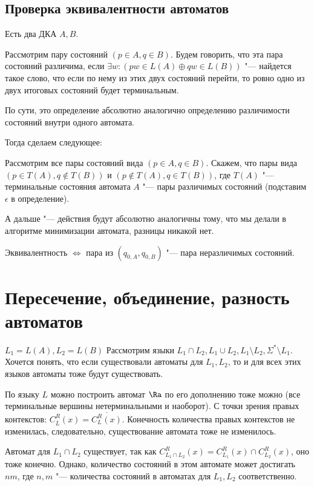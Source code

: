\subsection{Проверка эквивалентности автоматов}

\begin{Def}
Есть два ДКА $A, B$.

Рассмотрим пару состояний $(p \in A, q \in B)$. 
Будем говорить, что эта пара состояний различима, если $\exists w: (pw \in L(A) \oplus qw \in L(B))$ "---
найдется такое слово, что если по нему из этих двух состояний перейти, то ровно одно из двух итоговых состояний будет терминальным.
\end{Def}
\begin{Rem}
По сути, это определение абсолютно аналогично определению различимости состояний внутри одного автомата.
\end{Rem}

Тогда сделаем следующее:

Рассмотрим все пары состояний вида $(p \in A, q \in B)$.
Скажем, что пары вида $(p \in T(A), q \notin T(B))$ и $(p \notin T(A), q \in T(B))$, где $T(A)$ "--- терминальные состояния автомата $A$ "--- пары различимых состояний (подставим $\epsilon$ в определение).

А дальше "--- действия будут абсолютно аналогичны тому, что мы делали в алгоритме минимизации автомата, разницы никакой нет.

Эквивалентность $\iff$ пара из $(q_{0, A}, q_{0, B})$ "--- пара неразличимых состояний.

\section{Пересечение, объединение, разность автоматов}
$L_1 = L(A), L_2 = L(B)$
Рассмотрим языки $L_1 \cap L_2, L_1 \cup L_2, L_1 \setminus L_2, \Sigma^* \setminus L_1$. 
Хочется понять, что если существовали автоматы для $L_1, L_2$, то и для всех этих языков автоматы тоже будут существовать. 

По языку $L$ можно построить автомат $\Ra$ по его дополнению тоже можно (все терминальные вершины нетерминальными и наоборот).
С точки зрения правых контекстов: $C_{\overline{L}}^R(x) = \overline{C_L^R(x)}$. Конечность количества правых контекстов не изменилась, следовательно, существование автомата тоже не изменилось.

Автомат для $L_1 \cap L_2$ существует, так как $C_{L_1 \cap L_2}^R(x) = C_{L_1}^R(x) \cap C_{L_2}^R(x)$, оно тоже конечно. 
Однако, количество состояний в этом автомате может достигать $nm$, где $n, m$ "--- количества состояний в автоматах для $L_1, L_2$ соответственно.

